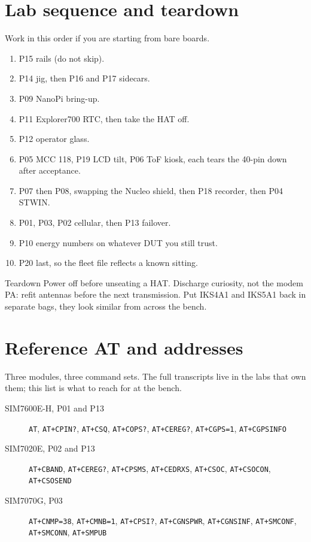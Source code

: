 \section{Lab sequence and teardown}

Work in this order if you are starting from bare boards.

\begin{enumerate}
\item P15 rails (do not skip).
\item P14 jig, then P16 and P17 sidecars.
\item P09 NanoPi bring-up.
\item P11 Explorer700 RTC, then take the HAT off.
\item P12 operator glass.
\item P05 MCC 118, P19 LCD tilt, P06 ToF kiosk, each tears the 40-pin down after acceptance.
\item P07 then P08, swapping the Nucleo shield, then P18 recorder, then P04 STWIN.
\item P01, P03, P02 cellular, then P13 failover.
\item P10 energy numbers on whatever DUT you still trust.
\item P20 last, so the fleet file reflects a known sitting.
\end{enumerate}

\begin{rulebox}{Teardown}
Power off before unseating a HAT. Discharge curiosity, not the modem PA: refit antennas before the next transmission. Put IKS4A1 and IKS5A1 back in separate bags, they look similar from across the bench.
\end{rulebox}

\section{Reference AT and addresses}

Three modules, three command sets. The full transcripts live in the labs that own them; this list is what to reach for at the bench.

\begin{description}
\item[SIM7600E-H, P01 and P13] \texttt{AT}, \texttt{AT+CPIN?}, \texttt{AT+CSQ}, \texttt{AT+COPS?}, \texttt{AT+CEREG?}, \texttt{AT+CGPS=1}, \texttt{AT+CGPSINFO}
\item[SIM7020E, P02 and P13] \texttt{AT+CBAND}, \texttt{AT+CEREG?}, \texttt{AT+CPSMS}, \texttt{AT+CEDRXS}, \texttt{AT+CSOC}, \texttt{AT+CSOCON}, \texttt{AT+CSOSEND}
\item[SIM7070G, P03] \texttt{AT+CNMP=38}, \texttt{AT+CMNB=1}, \texttt{AT+CPSI?}, \texttt{AT+CGNSPWR}, \texttt{AT+CGNSINF}, \texttt{AT+SMCONF}, \texttt{AT+SMCONN}, \texttt{AT+SMPUB}
\end{description}

